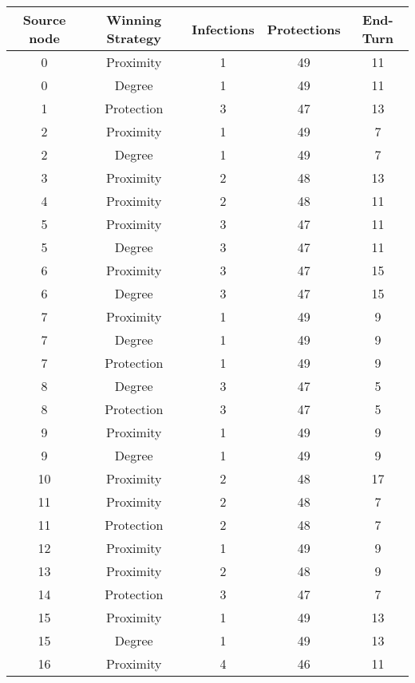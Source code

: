 \documentclass[results.tex]{subfiles}
\begin{document}
\begin{center}
  \begin{tabular}{| c || c | c | c | c |}
    \hline
    {\bfseries Source node} & {\bfseries Winning Strategy} & {\bfseries Infections} & {\bfseries Protections} & {\bfseries End-Turn} \\  %
    \hline\hline
    0 & Proximity & 1 & 49 & 11 \\ 
    \hline
    0 & Degree & 1 & 49 & 11 \\ 
    \hline
    1 & Protection & 3 & 47 & 13 \\ 
    \hline
    2 & Proximity & 1 & 49 & 7 \\ 
    \hline
    2 & Degree & 1 & 49 & 7 \\ 
    \hline
    3 & Proximity & 2 & 48 & 13 \\ 
    \hline
    4 & Proximity & 2 & 48 & 11 \\ 
    \hline
    5 & Proximity & 3 & 47 & 11 \\ 
    \hline
    5 & Degree & 3 & 47 & 11 \\ 
    \hline
    6 & Proximity & 3 & 47 & 15 \\ 
    \hline
    6 & Degree & 3 & 47 & 15 \\ 
    \hline
    7 & Proximity & 1 & 49 & 9 \\ 
    \hline
    7 & Degree & 1 & 49 & 9 \\ 
    \hline
    7 & Protection & 1 & 49 & 9 \\ 
    \hline
    8 & Degree & 3 & 47 & 5 \\ 
    \hline
    8 & Protection & 3 & 47 & 5 \\ 
    \hline
    9 & Proximity & 1 & 49 & 9 \\ 
    \hline
    9 & Degree & 1 & 49 & 9 \\ 
    \hline
    10 & Proximity & 2 & 48 & 17 \\ 
    \hline
    11 & Proximity & 2 & 48 & 7 \\ 
    \hline
    11 & Protection & 2 & 48 & 7 \\ 
    \hline
    12 & Proximity & 1 & 49 & 9 \\ 
    \hline
    13 & Proximity & 2 & 48 & 9 \\ 
    \hline
    14 & Protection & 3 & 47 & 7 \\ 
    \hline
    15 & Proximity & 1 & 49 & 13 \\ 
    \hline
    15 & Degree & 1 & 49 & 13 \\ 
    \hline
    16 & Proximity & 4 & 46 & 11 \\ 

\end{tabular}
\end{center}
\end{document}
